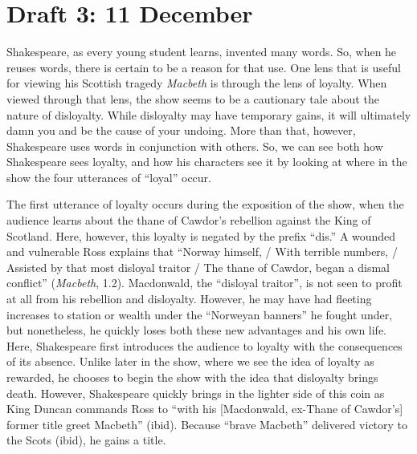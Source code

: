 \documentclass[12pt]{article}[titlepage]
\newcommand{\say}[1]{``#1''}
\newcommand{\1}{\={a}}
\newcommand{\2}{\={e}}
\newcommand{\3}{\={\i}}
\newcommand{\4}{\=o}
\newcommand{\5}{\=u}
\newcommand{\6}{\={A}}
\renewcommand{\,}{\textsuperscript{,}}
\begin{document}
\section{Draft 3: 11 December}
Shakespeare, as every young student learns, invented many words.
So, when he reuses words, there is certain to be a reason for that use.
One lens that is useful for viewing his Scottish tragedy \textit{Macbeth} is through the lens of loyalty.
When viewed through that lens, the show seems to be a cautionary tale about the nature of disloyalty.
While disloyalty may have temporary gains, it will ultimately damn you and be the cause of your undoing.
More than that, however, Shakespeare uses words in conjunction with others.
So, we can see both how Shakespeare sees loyalty, and how his characters see it by looking at where in the show the four utterances of \say{loyal} occur.

The first utterance of loyalty occurs during the exposition of the show, when the audience learns about the thane of Cawdor's rebellion against the King of Scotland.
Here, however, this loyalty is negated by the prefix \say{dis.}
A wounded and vulnerable Ross explains that \say{Norway himself, / With terrible numbers, / Assisted by that most disloyal traitor / The thane of Cawdor, began a dismal conflict} (\textit{Macbeth}, 1.2).
Macdonwald, the \say{disloyal traitor}, is not seen to profit at all from his rebellion and disloyalty.
However, he may have had fleeting increases to station or wealth under the \say{Norweyan banners} he fought under, but nonetheless, he quickly loses both these new advantages and his own life.
Here, Shakespeare first introduces the audience to loyalty with the consequences of its absence.
Unlike later in the show, where we see the idea of loyalty as rewarded, he chooses to begin the show with the idea that disloyalty brings death.
However, Shakespeare quickly brings in the lighter side of this coin as King Duncan commands Ross to \say{with his [Macdonwald, ex-Thane of Cawdor's] former title greet Macbeth} (ibid).
Because \say{brave Macbeth} delivered victory to the Scots (ibid), he gains a title.
\end{document}

